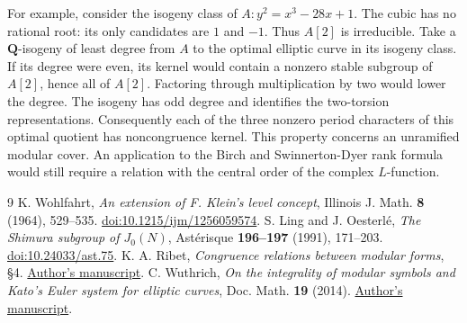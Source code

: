 \documentclass[11pt]{article}
\newcommand{\Q}{\mathbf Q}
\begin{document}
For example, consider the isogeny class of
\(A:y^2=x^3-28x+1\). The cubic has no rational root: its only candidates
are \(1\) and \(-1\). Thus \(A[2]\) is irreducible. Take a
\(\Q\)-isogeny of least degree from \(A\) to the optimal elliptic curve in
its isogeny class. If its degree were even, its kernel would contain a
nonzero stable subgroup of \(A[2]\), hence all of \(A[2]\).
Factoring through multiplication by two would lower the degree. The
isogeny has odd degree and identifies the two-torsion representations.
Consequently each of the three nonzero period characters of this optimal
quotient has noncongruence kernel. This property concerns an unramified
modular cover. An application to the Birch and Swinnerton-Dyer rank
formula would still require a relation with the central order of the
complex \(L\)-function.

\begin{thebibliography}{9}
 K. Wohlfahrt, \emph{An extension of F. Klein's level
concept}, Illinois J. Math. \textbf{8} (1964), 529--535.
\href{https://doi.org/10.1215/ijm/1256059574}{doi:10.1215/ijm/1256059574}.
 S. Ling and J. Oesterl\'e, \emph{The Shimura subgroup of
\(J_0(N)\)}, Ast\'erisque \textbf{196--197} (1991), 171--203.
\href{https://doi.org/10.24033/ast.75}{doi:10.24033/ast.75}.
 K. A. Ribet, \emph{Congruence relations between modular forms},
\S4. \href{https://math.berkeley.edu/~ribet/Articles/icm.pdf}{Author's manuscript}.
 C. Wuthrich, \emph{On the integrality of modular symbols and
Kato's Euler system for elliptic curves}, Doc. Math. \textbf{19} (2014).
\href{https://www.maths.nottingham.ac.uk/plp/pmzcw/download/int_kato.pdf}{Author's manuscript}.
\end{thebibliography}
\end{document}
